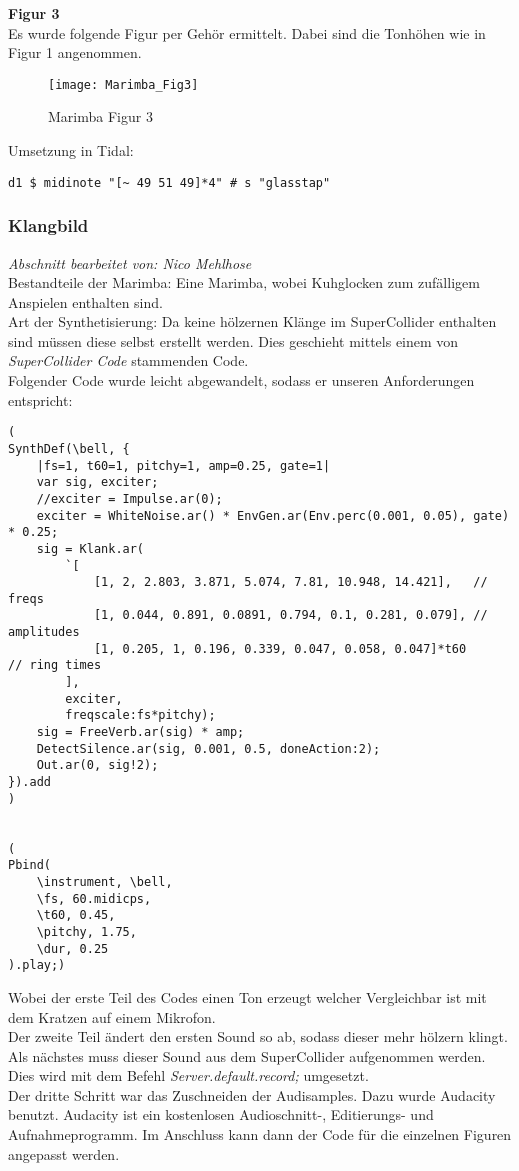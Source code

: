 \documentclass[
10pt, %
a4paper, %
oneside, %
headinclude,footinclude, %
BCOR5mm, %
]{scrartcl}
\begin{document}
\noindent \textbf{Figur 3}\\
Es wurde folgende Figur per Gehör ermittelt. Dabei sind die Tonhöhen wie in Figur 1 angenommen.
\begin{figure}[h]
	\centering 
	\texttt{[image: Marimba\_Fig3]} 
	\caption{Marimba Figur 3}
\end{figure}

\noindent Umsetzung in Tidal:
\begin{lstlisting}
d1 $ midinote "[~ 49 51 49]*4" # s "glasstap"
\end{lstlisting}


\subsubsection{Klangbild}
\textit{Abschnitt bearbeitet von: Nico Mehlhose}\\

\noindent Bestandteile der Marimba: Eine Marimba, wobei Kuhglocken zum zufälligem Anspielen enthalten sind.\\
Art der Synthetisierung: Da keine hölzernen Klänge im SuperCollider enthalten sind müssen diese selbst erstellt werden. Dies geschieht mittels 
einem von \textit{SuperCollider Code} stammenden Code.\cite{Marimba}\\
Folgender Code wurde leicht abgewandelt, sodass er unseren Anforderungen entspricht:
\begin{lstlisting}
(
SynthDef(\bell, {
	|fs=1, t60=1, pitchy=1, amp=0.25, gate=1|
	var sig, exciter;
	//exciter = Impulse.ar(0);
	exciter = WhiteNoise.ar() * EnvGen.ar(Env.perc(0.001, 0.05), gate) * 0.25;
	sig = Klank.ar(
		`[
			[1, 2, 2.803, 3.871, 5.074, 7.81, 10.948, 14.421],   // freqs
			[1, 0.044, 0.891, 0.0891, 0.794, 0.1, 0.281, 0.079], // amplitudes
			[1, 0.205, 1, 0.196, 0.339, 0.047, 0.058, 0.047]*t60     // ring times
		],
		exciter,
		freqscale:fs*pitchy);
	sig = FreeVerb.ar(sig) * amp;
	DetectSilence.ar(sig, 0.001, 0.5, doneAction:2);
	Out.ar(0, sig!2);
}).add
)


(
Pbind(
	\instrument, \bell,
	\fs, 60.midicps,
	\t60, 0.45,
	\pitchy, 1.75,
	\dur, 0.25
).play;)
\end{lstlisting}
Wobei der erste Teil des Codes einen Ton erzeugt welcher Vergleichbar ist mit dem Kratzen auf einem Mikrofon.\\
Der zweite Teil ändert den ersten Sound so ab, sodass dieser mehr hölzern klingt.\\
Als nächstes muss dieser Sound aus dem SuperCollider aufgenommen werden. Dies wird mit dem Befehl \textit{Server.default.record;} umgesetzt.\cite{tidcy}\\
Der dritte Schritt war das Zuschneiden der Audisamples. Dazu wurde Audacity benutzt. Audacity ist ein kostenlosen Audioschnitt-, Editierungs- und Aufnahmeprogramm.\cite{Auda} Im Anschluss kann dann der Code für die einzelnen Figuren angepasst werden.\\
		
\end{document}

